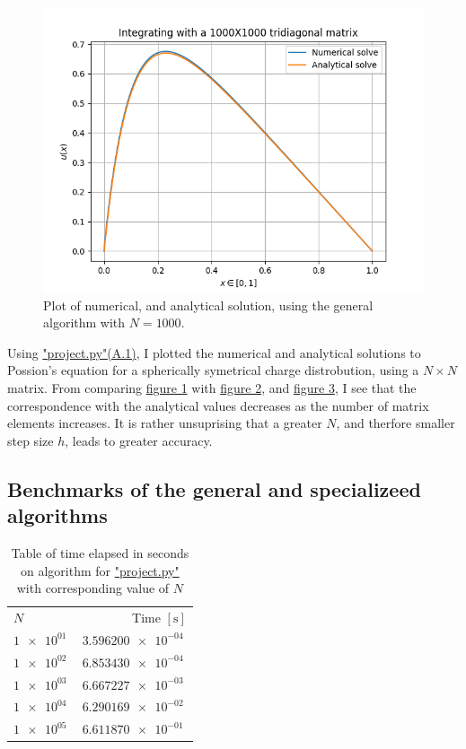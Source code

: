 \documentclass[english,notitlepage,reprint]{revtex4-1}  %
\begin{document}
\begin{figure}[H]
	\centering
	\label{fig:413}
	\includegraphics[width=\columnwidth]{../figures/NumVsAnal1000x1000.png}
	\caption{Plot of numerical, and analytical solution, using the general algorithm with
	\(N=1000\).}
\end{figure}
Using \hyperref[A:1]{"project.py"(A.1)}, I plotted the numerical and analytical solutions to Possion's equation for a spherically symetrical charge distrobution, using a \(N\times N\) matrix. From comparing \hyperref[fig:411]{figure 1} with \hyperref[fig:412]{figure 2}, and \hyperref[fig:413]{figure 3}, I see that the correspondence with the analytical values decreases as the number of matrix elements increases. It is rather unsuprising that a greater \(N\), and therfore smaller step size \(h\), leads to greater accuracy.


\subsection{Benchmarks of the general and specializeed algorithms}\label{subsec:42}
\begin{table}[H]
	\centering
	\label{tab:421}
	\begin{tabular}{l|r}
	\(N\) & Time \([\si{\second}]\) \\
	\(\SI{1e+01}{}\) & \(\SI{3.596200e-04}{}\) \\
	\(\SI{1e+02}{}\) & \(\SI{6.853430e-04}{}\) \\
	\(\SI{1e+03}{}\) & \(\SI{6.667227e-03}{}\) \\
	\(\SI{1e+04}{}\) & \(\SI{6.290169e-02}{}\) \\
	\(\SI{1e+05}{}\) & \(\SI{6.611870e-01}{}\) \\
	\end{tabular}
	\caption{Table of time elapsed in seconds on algorithm for
	\hyperref[A:1]{"project.py"} with corresponding value of \(N\)}
\end{table}
\end{document}
